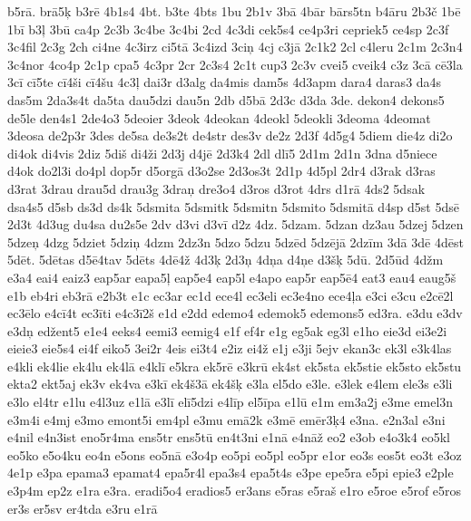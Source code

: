 {{b5r\={a}. br\={a}5\c{k} b3r\={e} 4b1s4 4bt. b3te 4bts 1bu 2b1v 3b\={a}
4b\={a}r b\={a}rs5tn b4\={a}ru 2b3\v{c} 1b\={e} 1b\={i} b3\c{l}
3b\={u} ca4p 2c3b 3c4be 3c4bi 2cd 4c3di cek5s4 ce4p3ri cepriek5
ce4sp 2c3f 3c4fil 2c3g 2ch ci4ne 4c3irz ci5t\={a} 3c4izd 3ci\c{n}
4cj c3j\={a} 2c1k2 2cl c4leru 2c1m 2c3n4 3c4nor 4co4p 2c1p cpa5
4c3pr 2cr 2c3s4 2c1t cup3 2c3v cvei5 cveik4 c3z 3c\={a} c\={e}3la 3c\={i}
c\={i}5te c\={i}4\v{s}i c\={i}4\v{s}u 4c3\c{l} dai3r d3alg
da4mis dam5s 4d3apm dara4 daras3 da4s das5m 2da3s4t da5ta dau5dzi
dau5n 2db d5b\={a} 2d3c d3da 3de. dekon4 dekons5 de5le den4s1 2de4o3
5deoier 3deok 4deokan 4deokl 5deokli 3deoma 4deomat 3deosa de2p3r
3des de5sa de3s2t de4str des3v de2z 2d3f 4d5g4 5diem die4z di2o di4ok
di4vis 2diz 5di\v{s} di4\v{z}i 2d3j d4j\={e} 2d3k4 2dl dl\={i}5
2d1m 2d1n 3dna d5niece d4ok do2l3i do4pl dop5r d5org\={a} d3o2se
2d3os3t 2d1p 4d5pl 2dr4 d3rak d3ras d3rat 3drau drau5d drau3g 3dra\c{n}
dre3o4 d3ros d3rot 4drs d1r\={a} 4ds2 5dsak dsa4s5 d5sb ds3d
ds4k 5dsmita 5dsmitk 5dsmitn 5dsmito 5dsmit\={a} d4sp d5st 5ds\={e}
2d3t 4d3ug du4sa du2s5e 2dv d3vi d3v\={i} d2z 4dz. 5dzam. 5dzan
dz3au 5dzej 5dzen 5dze\c{n} 4dzg 5dziet 5dzi\c{n} 4dzm 2dz3n 5dzo
5dzu 5dz\={e}d 5dz\={e}j\={a} 2dz\={i}m 3d\={a} 3d\={e} 4d\={e}st
5d\={e}t. 5d\={e}tas d5\={e}4tav 5d\={e}ts 4d\={e}4\v{z}
4d3\c{k} 2d3\c{n} 4d\c{n}a d4\c{n}e d3\v{s}\c{k} 5d\={u}.
2d5\={u}d 4d\v{z}m e3a4 eai4 eaiz3 eap5ar eapa5\c{l} eap5e4
eap5l e4apo eap5r eap5\={e}4 eat3 eau4 eaug5\v{s} e1b eb4ri eb3r\={a}
e2b3t e1c ec3ar ec1d ece4l ec3eli ec3e4no ece4\c{l}a e3ci e3cu
e2c\={e}2l ec3\={e}lo e4c\={i}4t ec3\={i}ti e4c3\={i}2\v{s} e1d
e2dd edemo4 edemok5 edemons5 ed3ra. e3du e3dv e3d\c{n} ed\v{z}ent5
e1e4 eeks4 eemi3 eemig4 e1f ef4r e1g eg5ak eg3l e1ho eie3d ei3e2i
eieie3 eie5s4 ei4f eiko5 3ei2r 4eis ei3t4 e2iz ei4\v{z} e1j e3ji
5ejv ekan3c ek3l e3k4las e4kli ek4lie ek4lu ek4l\={a} e4kl\={i} e5kra
ek5r\={e} e3kr\={u} ek4st ek5sta ek5stie ek5sto ek5stu ekta2 ekt5aj
ek3v ek4va e3k\={i} ek4\v{s}3\={a} ek4\v{s}\c{k} e3la el5do e3le.
e3lek e4lem ele3s e3li e3lo el4tr e1lu e4l3uz e1l\={a} e3l\={i} el\={i}5dzi
e4l\={i}p el5\={i}pa e1l\={u} e1m em3a2j e3me emel3n e3m4i
e4mj e3mo emont5i em4pl e3mu em\={a}2k e3m\={e} em\={e}r3\c{k}4
e3na. e2n3al e3ni e4nil e4n3ist eno5r4ma ens5tr ens5t\={u}
en4t3ni e1n\={a} e4n\={a}\v{z} eo2 e3ob e4o3k4 eo5kl eo5ko
e5o4ku eo4n e5ons eo5n\={a} e3o4p eo5pi eo5pl eo5pr e1or eo3s eos5t
eo3t e3oz 4e1p e3pa epama3 epamat4 epa5r4l epa3s4 epa5t4s e3pe epe5ra
e5pi epie3 e2ple e3p4m ep2z e1ra e3ra. eradi5o4 eradios5 er3ans
e5ras e5ra\v{s} e1ro e5roe e5rof e5ros er3s er5sv er4tda e3ru e1r\={a}
}}
